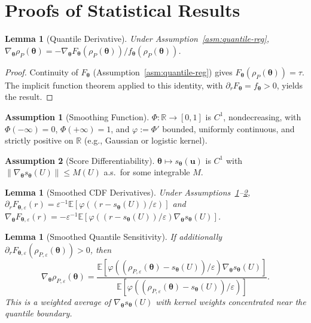 \documentclass[11pt]{article}
\newcommand{\R}{\mathbb{R}}
\newcommand{\E}{\mathbb{E}}
\newcommand{\norm}[1]{\|#1\|}
\newcommand{\btheta}{\bm{\theta}}
\newcommand{\bu}{\bm{u}}
\newtheorem{lemma}[theorem]{Lemma}
\theoremstyle{definition}
\newtheorem{assumption}{Assumption}
\begin{document}
\section{Proofs of Statistical Results}
\label{app:statistical-proofs}

\begin{lemma}[Quantile Derivative]\label{lem:quantile-deriv}
Under Assumption~\ref{asm:quantile-reg}, $\nabla_{\btheta} \rho_P(\btheta) = -\nabla_{\btheta} F_{\btheta}(\rho_P(\btheta))/f_{\btheta}(\rho_P(\btheta))$.
\end{lemma}

\begin{proof}
Continuity of $F_{\btheta}$ (Assumption~\ref{asm:quantile-reg}) gives $F_{\btheta}(\rho_P(\btheta))=\tau$. The implicit function theorem applied to this identity, with $\partial_r F_{\btheta}=f_{\btheta}>0$, yields the result.
\end{proof}

\begin{assumption}[Smoothing Function]\label{asm:smoothing}
$\Phi: \R \to [0,1]$ is $C^1$, nondecreasing, with $\Phi(-\infty)=0$, $\Phi(+\infty)=1$, and $\varphi := \Phi'$ bounded, uniformly continuous, and strictly positive on $\R$ (e.g., Gaussian or logistic kernel).
\end{assumption}

\begin{assumption}[Score Differentiability]\label{asm:score-diff}
$\btheta \mapsto s_{\btheta}(\bu)$ is $C^1$ with $\norm{\nabla_{\btheta} s_{\btheta}(U)} \leq M(U)$ a.s.\ for some integrable $M$.
\end{assumption}

\begin{lemma}[Smoothed CDF Derivatives]\label{lem:smoothed-derivatives}
Under Assumptions~\ref{asm:smoothing}--\ref{asm:score-diff}, $\partial_r F_{\btheta,\varepsilon}(r) = \varepsilon^{-1}\E[\varphi((r-s_{\btheta}(U))/\varepsilon)]$ and $\nabla_{\btheta} F_{\btheta,\varepsilon}(r) = -\varepsilon^{-1}\E[\varphi((r-s_{\btheta}(U))/\varepsilon)\nabla_{\btheta} s_{\btheta}(U)]$.
\end{lemma}

\begin{lemma}[Smoothed Quantile Sensitivity]\label{lem:smoothed-quantile-deriv}
If additionally $\partial_r F_{\btheta,\varepsilon}(\rho_{P,\varepsilon}(\btheta)) > 0$, then
\begin{equation}\label{eq:rhoeps-deriv}
\nabla_{\btheta} \rho_{P,\varepsilon}(\btheta) = \frac{\E[\varphi((\rho_{P,\varepsilon}(\btheta) - s_{\btheta}(U))/\varepsilon) \nabla_{\btheta} s_{\btheta}(U)]}{\E[\varphi((\rho_{P,\varepsilon}(\btheta) - s_{\btheta}(U))/\varepsilon)]}.
\end{equation}
This is a weighted average of $\nabla_{\btheta}s_{\btheta}(U)$ with kernel weights concentrated near the quantile boundary.
\end{lemma}
\end{document}
